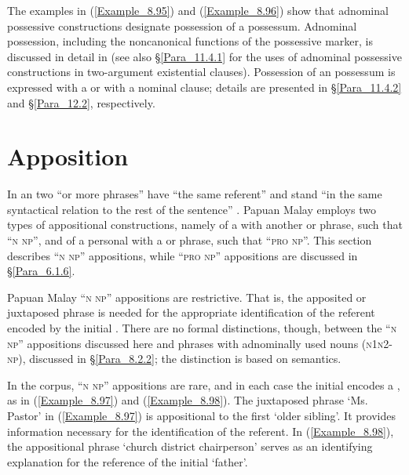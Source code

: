 The examples in (\ref{Example_8.95}) and (\ref{Example_8.96}) show that adnominal possessive constructions designate possession of a  possessum. Adnominal possession, including the noncanonical functions of the possessive marker, is discussed in detail in  (see also §\ref{Para_11.4.1} for the uses of adnominal possessive constructions in two-argument existential clauses). Possession of an  possessum is expressed with a  or with a nominal clause; details are presented in §\ref{Para_11.4.2} and §\ref{Para_12.2}, respectively.


\section{Apposition}
\label{Para_8.5}
In an  two “or more  phrases” have “the same referent” and stand “in the same syntactical relation to the rest of the sentence” \citep[5093]{Asher.1994}. Papuan Malay employs two types of appositional constructions, namely  of a  with another  or  phrase, such that ``\textsc{n} \textsc{np}'', and  of a personal  with a  or  phrase, such that ``\textsc{pro} \textsc{np}''. This section describes ``\textsc{n} \textsc{np}'' appositions, while ``\textsc{pro} \textsc{np}'' appositions are discussed in §\ref{Para_6.1.6}.



Papuan Malay ``\textsc{n} \textsc{np}'' appositions are restrictive. That is, the apposited or juxtaposed  phrase is needed for the appropriate identification of the referent encoded by the initial . There are no formal distinctions, though, between the ``\textsc{n} \textsc{np}'' appositions discussed here and  phrases with adnominally used nouns (\textsc{n1n2-np}), discussed in §\ref{Para_8.2.2}; the distinction is based on semantics.



In the corpus, ``\textsc{n} \textsc{np}'' appositions are rare, and in each case the initial  encodes a , as in (\ref{Example_8.97}) and (\ref{Example_8.98}). The juxtaposed  phrase  ‘Ms. Pastor’ in (\ref{Example_8.97}) is appositional to the first   ‘older sibling’. It provides information necessary for the identification of the referent. In (\ref{Example_8.98}), the appositional  phrase  ‘church district chairperson’ serves as an identifying explanation for the reference of the initial   ‘father’.


